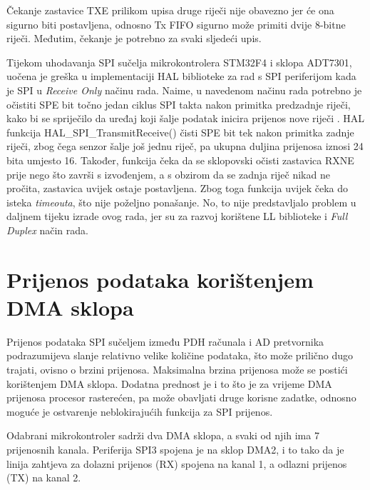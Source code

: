 		Čekanje zastavice TXE prilikom upisa druge riječi nije obavezno jer će ona sigurno biti postavljena, odnosno Tx FIFO sigurno može primiti dvije 8-bitne riječi. Međutim, čekanje je potrebno za svaki sljedeći upis.
	
		
		Tijekom uhodavanja SPI sučelja mikrokontrolera STM32F4 i sklopa ADT7301, uočena je greška u implementaciji HAL biblioteke za rad s SPI periferijom kada je SPI u \textit{Receive Only} načinu rada. Naime, u navedenom načinu rada potrebno je očistiti SPE bit točno jedan ciklus SPI takta nakon primitka predzadnje riječi, kako bi se spriječilo da uređaj koji šalje podatak inicira prijenos nove riječi \citep[str.~894]{stm32f4}. HAL funkcija HAL\_SPI\_TransmitReceive() čisti SPE bit tek nakon primitka zadnje riječi, zbog čega senzor šalje još jednu riječ, pa ukupna duljina prijenosa iznosi 24 bita umjesto 16. Također, funkcija čeka da se sklopovski očisti zastavica RXNE prije nego što završi s izvođenjem, a s obzirom da se zadnja riječ nikad ne pročita, zastavica uvijek ostaje postavljena. Zbog toga funkcija uvijek čeka do isteka \textit{timeouta}, što nije poželjno ponašanje. No, to nije predstavljalo problem u daljnem tijeku izrade ovog rada, jer su za razvoj korištene LL biblioteke i \textit{Full Duplex} način rada.
		
	\section{Prijenos podataka korištenjem DMA sklopa}
		
		Prijenos podataka SPI sučeljem između PDH računala i AD pretvornika podrazumijeva slanje relativno velike količine podataka, što može prilično dugo trajati, ovisno o brzini prijenosa. Maksimalna brzina prijenosa može se postići korištenjem DMA sklopa. Dodatna prednost je i to što je za vrijeme DMA prijenosa procesor rasterećen, pa može obavljati druge korisne zadatke, odnosno moguće je ostvarenje neblokirajućih funkcija za SPI prijenos.
		
		Odabrani mikrokontroler sadrži dva DMA sklopa, a svaki od njih ima 7 prijenosnih kanala. Periferija SPI3 spojena je na sklop DMA2, i to tako da je linija zahtjeva za dolazni prijenos (RX) spojena na kanal 1, a odlazni prijenos (TX) na kanal 2. 
		
